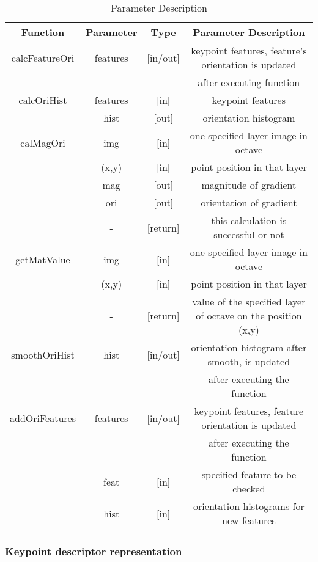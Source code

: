 \documentclass[paper=a4, fontsize=11pt]{scrartcl} %
\numberwithin{equation}{section} %
\numberwithin{figure}{section} %
\numberwithin{table}{section} %
\begin{document}
\begin{table}[H]
    \centering
    \begin{tabular}{|c|c|c|c|}
        \hline
        \textbf{Function} & \textbf{Parameter} & \textbf{Type} & \textbf{Parameter Description} \\\hline
       calcFeatureOri & features & [in/out] & keypoint features, feature's orientation is updated \\
       & &  & after executing function\\\hline
        calcOriHist & features & [in] & keypoint features \\
                        & hist & [out] & orientation histogram \\\hline
        calMagOri & img & [in] & one specified layer image in octave \\
                  & (x,y) & [in] & point position in that layer \\
                  & mag & [out] & magnitude of gradient \\
                  & ori & [out] & orientation of gradient \\
                        & - &[return] & this calculation is successful or not \\\hline
        getMatValue & img & [in] & one specified layer image in octave \\
                  & (x,y) & [in] & point position in that layer \\
                        & - &[return] & value of the specified layer of octave on the position (x,y)\\\hline
        smoothOriHist & hist & [in/out] & orientation histogram after smooth, is updated \\
        & &  & after executing the function \\\hline
        addOriFeatures & features & [in/out] & keypoint features, feature orientation is updated \\
        & &  & after executing the function\\
                       & feat & [in] & specified feature to be checked \\
                       & hist & [in] & orientation histograms for new features \\\hline
    \end{tabular}
    \caption{Parameter Description}\label{nolock}
\end{table}

\subsubsection{Keypoint descriptor representation}
\end{document}
